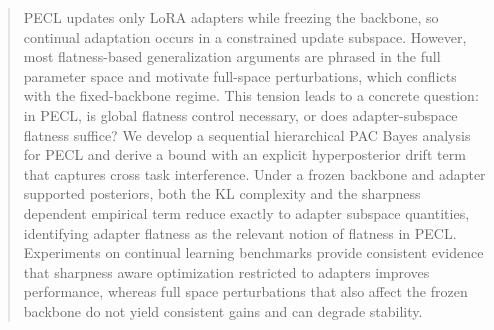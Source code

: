 \documentclass{article}
\theoremstyle{plain}
\theoremstyle{definition}
\theoremstyle{remark}
\begin{document}

\begin{abstract}

PECL updates only LoRA adapters while freezing the backbone, so continual adaptation occurs in a constrained update subspace. However, most flatness-based generalization arguments are phrased in the full parameter space and motivate full-space perturbations, which conflicts with the fixed-backbone regime. This tension leads to a concrete question: in PECL, is global flatness control necessary, or does adapter-subspace flatness suffice?
We develop a sequential hierarchical PAC Bayes analysis for PECL and derive a bound with an explicit hyperposterior drift term that captures cross task interference. Under a frozen backbone and adapter supported posteriors, both the KL complexity and the sharpness dependent empirical term reduce exactly to adapter subspace quantities, identifying adapter flatness as the relevant notion of flatness in PECL. Experiments on continual learning benchmarks provide consistent evidence that sharpness aware optimization restricted to adapters improves performance, whereas full space perturbations that also affect the frozen backbone do not yield consistent gains and can degrade stability.





\end{abstract}
\end{document}
